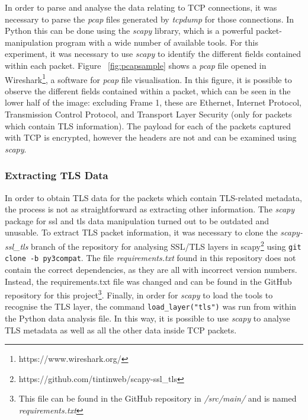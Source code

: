 \documentclass{l4proj}
\begin{document}
In order to parse and analyse the data relating to TCP connections, it was necessary to parse the \emph{pcap} files generated by \emph{tcpdump} for those connections. In Python this can be done using the \emph{scapy} library, which is a powerful packet-manipulation program with a wide number of available tools. For this experiment, it was necessary to use \emph{scapy} to identify the different fields contained within each packet. Figure ~\ref{fig:pcapsample} shows a \emph{pcap} file opened in Wireshark\footnote{https://www.wireshark.org/}, a software for \emph{pcap} file visualisation. In this figure, it is possible to observe the different fields contained within a packet, which can be seen in the lower half of the image: excluding Frame 1, these are Ethernet, Internet Protocol, Transmission Control Protocol, and Transport Layer Security (only for packets which contain TLS information). The payload for each of the packets captured with TCP is encrypted, however the headers are not and can be examined using \emph{scapy}.

\subsubsection{Extracting TLS Data} In order to obtain TLS data for the packets which contain TLS-related metadata, the process is not as straightforward as extracting other information. The \emph{scapy} package for ssl and tls data manipulation turned out to be outdated and unusable. To extract TLS packet information, it was necessary to clone the \emph{scapy-ssl\_tls} branch of the repository for analysing SSL/TLS layers in scapy\footnote{https://github.com/tintinweb/scapy-ssl\_tls} using \lstinline{git clone -b py3compat}. The file \emph{requirements.txt} found in this repository does not contain the correct dependencies, as they are all with incorrect version numbers. Instead, the requirements.txt file was changed and can be found in the GitHub repository for this project\footnote{This file can be found in the GitHub repository in \emph{/src/main/} and is named \emph{requirements.txt}}. Finally, in order for \emph{scapy} to load the tools to recognise the TLS layer, the command \lstinline{load_layer("tls")} was run from within the Python data analysis file. In this way, it is possible to use \emph{scapy} to analyse TLS metadata as well as all the other data inside TCP packets.
\end{document}
